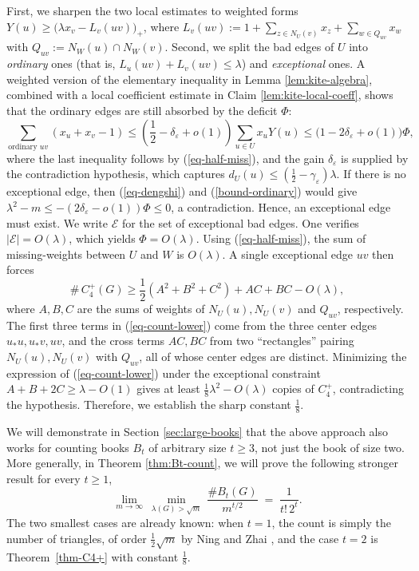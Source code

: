 \documentclass[10pt,a4paper]{amsart}
\renewcommand{\le}{\leqslant}
\renewcommand{\ge}{\geqslant}
\begin{document}
 First, 
we sharpen the two local estimates to weighted forms
$Y(u)\ge \big(\lambda x_v-L_v(uv) \big)_+$, where  $L_v(uv):=1+\sum_{z\in N_U(v)} x_z + \sum_{w\in Q_{uv}} x_w$ with $Q_{uv}:=N_W(u)\cap N_W(v)$.   Second, we split the bad
edges of $U$ into \emph{ordinary} ones (that is, $L_u(uv)+L_v(uv)\le\lambda$) and
\emph{exceptional} ones. A weighted version of the elementary inequality in Lemma \ref{lem:kite-algebra}, combined with
a local coefficient estimate in Claim \ref{lem:kite-local-coeff}, shows that the ordinary edges are still absorbed
by the deficit $\Phi$:
\begin{equation} \label{bound-ordinary}  \sum_{\text{ordinary $uv$}}(x_u+x_v-1)\le \left( \frac{1}{2}-\delta_{\varepsilon}+o(1) \right) \sum_{u\in U} x_uY(u) \le \big( 1- 2\delta_{\varepsilon} + o(1) \big)\Phi, 
\end{equation} 
where the last inequality follows by (\ref{eq-half-miss}), and the gain
$\delta_{\varepsilon}$ is supplied by the contradiction hypothesis, which captures 
$d_U(u)\le(\tfrac12-\gamma_{\varepsilon} )\lambda$. 
If there is no exceptional edge, then
 (\ref{eq-dengshi}) and (\ref{bound-ordinary})  would give $\lambda^2-m\le-(2\delta_{\varepsilon} -o(1))\Phi\le0$, a contradiction.
Hence, an exceptional edge must exist. 
We write $\mathcal E$ for the set of exceptional bad edges. One verifies $|\mathcal E|=O(\lambda)$, which yields 
$\Phi=O(\lambda)$. Using (\ref{eq-half-miss}), the sum of missing-weights between $U$ and $W$ is $O(\lambda)$. A single
exceptional edge $uv$ then forces
\begin{equation} \label{eq-count-lower}
\texttt{\#} \,C_4^+(G)\ge 
\frac{1}{2} (A^2+B^2+C^2)+AC+BC-O(\lambda),
\end{equation}
where $A,B,C$ are the sums of weights of $N_U(u),N_U(v)$ and
$Q_{uv}$, respectively. 
The first three terms in (\ref{eq-count-lower}) come from the three center
edges $u_*u,u_*v,uv$, and the cross terms $AC,BC$ from two ``rectangles''
pairing $N_U(u),N_U(v)$ with $Q_{uv}$, all of whose center edges are distinct.
Minimizing the expression of (\ref{eq-count-lower}) under the exceptional constraint
$A+B+2C\ge\lambda-O(1)$ gives at least $\tfrac18\lambda^2-O(\lambda)$ copies of
$C_4^+$, contradicting the hypothesis. 
Therefore, we establish the sharp constant
$\tfrac18$. 

\smallskip 
\noindent
{} 
We will demonstrate in Section \ref{sec:large-books} that the above approach also works for counting books $B_t$ of arbitrary size $t \ge 3$, not just the book of size two. 
More generally, in Theorem \ref{thm:Bt-count}, we will prove the following stronger result for every $t\ge 1$,   
\begin{equation} \label{eq-heart} \tag{$\heartsuit$}
   \lim_{m\to\infty}\ \min_{\lambda(G)>\sqrt m}\
   \frac{\texttt{\#} B_t(G)}{m^{t/2}}\;=\;\frac{1}{t!\,2^{t}} .
\end{equation}
The two smallest cases are already known: when $t=1$, the count is simply the number of triangles, of order $\tfrac12\sqrt m$ by Ning and Zhai \cite{NingZhai2023},
and the case $t=2$ is Theorem~\ref{thm-C4+} with constant $\tfrac18$. 
\end{document}
